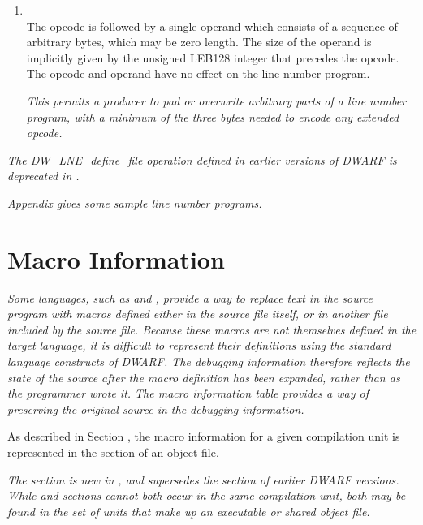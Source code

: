 \begin{enumerate}[1. ]
\bb
\item \textbf{\DWLNEpaddingTARG} \\
The \DWLNEpaddingNAME{} opcode is followed by a single
operand which consists of a sequence of arbitrary bytes,
which may be zero length.  The size of the operand is
implicitly given by the unsigned LEB128
integer that precedes the opcode.  The opcode and operand have no
effect on the line number program.

\textit{This permits a producer to pad or overwrite arbitrary
parts of a line number program, with a minimum of the
three bytes needed to encode any extended opcode.}
\eb

\end{enumerate}

\textit{The DW\_LNE\_define\_file operation defined
in earlier versions of DWARF is deprecated in \DWARFVersionV.}

\textit{Appendix  
gives some sample line number programs.}

\section{Macro Information}
\label{chap:macroinformation}
\textit{Some languages, such as 
 and 
, provide a way to replace
text in the source program with macros defined either in the
source file itself, or in another file included by the source
file.  Because these macros are not themselves defined in the
target language, it is difficult to represent their definitions
using the standard language constructs of DWARF. The debugging
information therefore reflects the state of the source after
the macro definition has been expanded, rather than as the
programmer wrote it. The macro information table provides a way
of preserving the original source in the debugging information.}

As described in 
Section ,
the macro information for a
given compilation unit is represented in the 
\dotdebugmacro{}
section of an object file. 

\textit{The \dotdebugmacro{} section is new in 
\DWARFVersionV, and supersedes the
\dotdebugmacinfo{} section of earlier DWARF versions. 
While \dotdebugmacro{} and \dotdebugmacinfo{}
sections cannot both occur in the same compilation unit, both may be found in the 
set of units that make up an executable or shared object file.}

